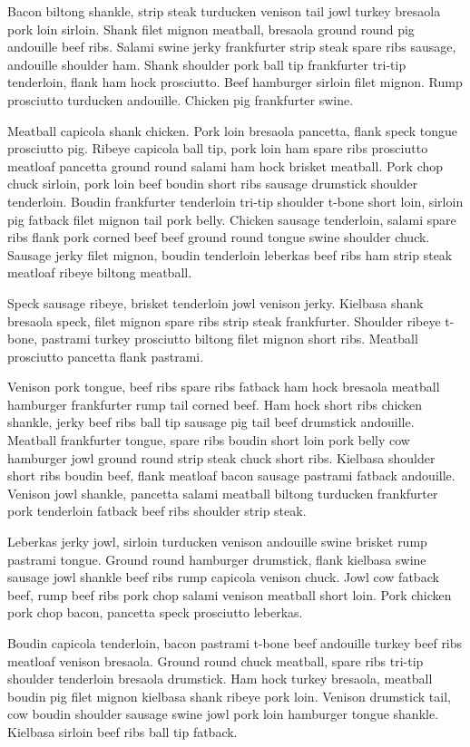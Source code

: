 Bacon biltong shankle, strip steak turducken venison tail jowl turkey bresaola pork loin sirloin. Shank filet mignon meatball, bresaola ground round pig andouille beef ribs. Salami swine jerky frankfurter strip steak spare ribs sausage, andouille shoulder ham. Shank shoulder pork ball tip frankfurter tri-tip tenderloin, flank ham hock prosciutto. Beef hamburger sirloin filet mignon. Rump prosciutto turducken andouille. Chicken pig frankfurter swine.

Meatball capicola shank chicken. Pork loin bresaola pancetta, flank speck tongue prosciutto pig. Ribeye capicola ball tip, pork loin ham spare ribs prosciutto meatloaf pancetta ground round salami ham hock brisket meatball. Pork chop chuck sirloin, pork loin beef boudin short ribs sausage drumstick shoulder tenderloin. Boudin frankfurter tenderloin tri-tip shoulder t-bone short loin, sirloin pig fatback filet mignon tail pork belly. Chicken sausage tenderloin, salami spare ribs flank pork corned beef beef ground round tongue swine shoulder chuck. Sausage jerky filet mignon, boudin tenderloin leberkas beef ribs ham strip steak meatloaf ribeye biltong meatball.

Speck sausage ribeye, brisket tenderloin jowl venison jerky. Kielbasa shank bresaola speck, filet mignon spare ribs strip steak frankfurter. Shoulder ribeye t-bone, pastrami turkey prosciutto biltong filet mignon short ribs. Meatball prosciutto pancetta flank pastrami.

Venison pork tongue, beef ribs spare ribs fatback ham hock bresaola meatball hamburger frankfurter rump tail corned beef. Ham hock short ribs chicken shankle, jerky beef ribs ball tip sausage pig tail beef drumstick andouille. Meatball frankfurter tongue, spare ribs boudin short loin pork belly cow hamburger jowl ground round strip steak chuck short ribs. Kielbasa shoulder short ribs boudin beef, flank meatloaf bacon sausage pastrami fatback andouille. Venison jowl shankle, pancetta salami meatball biltong turducken frankfurter pork tenderloin fatback beef ribs shoulder strip steak.

Leberkas jerky jowl, sirloin turducken venison andouille swine brisket rump pastrami tongue. Ground round hamburger drumstick, flank kielbasa swine sausage jowl shankle beef ribs rump capicola venison chuck. Jowl cow fatback beef, rump beef ribs pork chop salami venison meatball short loin. Pork chicken pork chop bacon, pancetta speck prosciutto leberkas.

Boudin capicola tenderloin, bacon pastrami t-bone beef andouille turkey beef ribs meatloaf venison bresaola. Ground round chuck meatball, spare ribs tri-tip shoulder tenderloin bresaola drumstick. Ham hock turkey bresaola, meatball boudin pig filet mignon kielbasa shank ribeye pork loin. Venison drumstick tail, cow boudin shoulder sausage swine jowl pork loin hamburger tongue shankle. Kielbasa sirloin beef ribs ball tip fatback.


